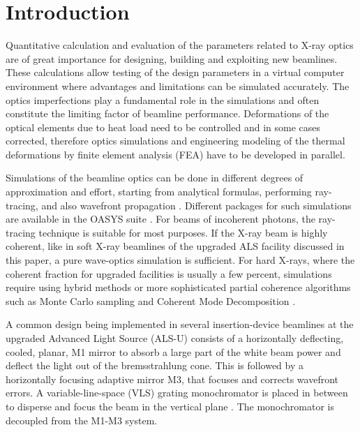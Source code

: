 \documentclass{iucr}
\begin{document}
%
%
%
\section{Introduction}
\label{sec:intro}  

Quantitative calculation and evaluation of the parameters related to X-ray optics are of great importance for designing, building and exploiting new beamlines. These calculations allow testing of the design parameters in a virtual computer environment where advantages and limitations can be simulated accurately. The optics imperfections play a fundamental role in the simulations and often constitute the limiting factor of beamline performance. Deformations of the optical elements due to heat load need to be controlled and in some cases corrected, therefore optics simulations and engineering modeling of the thermal deformations by finite element analysis (FEA) have to be developed in parallel. 

Simulations of the beamline optics can be done in different degrees of approximation and effort, starting from analytical formulas, performing ray-tracing, and also wavefront propagation \cite{hyerarchical}. Different packages for such simulations are available in the OASYS suite \cite{codeOASYS}. For beams of incoherent photons, the ray-tracing technique is suitable for most purposes. If the X-ray beam is highly coherent, like in soft X-ray beamlines of the upgraded ALS facility discussed in this paper, a pure wave-optics simulation is sufficient. For hard X-rays, where the coherent fraction for upgraded facilities is usually a few percent, simulations require using hybrid methods \cite{hybrid} or more sophisticated partial coherence algorithms such as Monte Carlo sampling \cite{Chubar2011b} and Coherent Mode Decomposition \cite{codeCOMSYL}. 

A common design being implemented in several insertion-device beamlines at the upgraded Advanced Light Source (ALS-U) consists of a horizontally deflecting, cooled, planar, M1 mirror to absorb a large part of the white beam power and deflect the light out of the bremsstrahlung cone. This is followed by a horizontally focusing adaptive mirror M3, that focuses and corrects wavefront errors. A variable-line-space (VLS) grating monochromator is placed in between to disperse and focus the beam in the vertical plane \cite{reininger2005}. The monochromator is decoupled from the M1-M3 system. 
\end{document}
